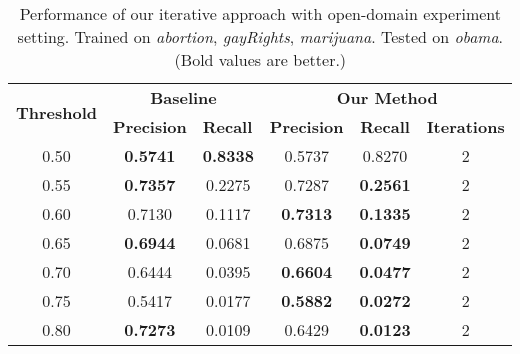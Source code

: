 \documentclass[11pt,a4paper]{article}
\begin{document}
\begin{table*}[h]
\begin{center}
\begin{tabular}{|c||c|c|c|c|c|}
\hline
\multicolumn{1}{|c|}{\multirow{2}{*}{\bf Threshold}} & \multicolumn{2}{c|}{\bf Baseline}  & \multicolumn{3}{c|}{\bf Our Method}    \\ \cline{2-6} 
\multicolumn{1}{|c|}{}   & \multicolumn{1}{l|}{\bf Precision} & \multicolumn{1}{l|}{\bf Recall} & \multicolumn{1}{l|}{\bf Precision} & \multicolumn{1}{c|}{\bf Recall} & \multicolumn{1}{l|}{\bf Iterations} \\ \hline
 \hline
0.50 &\bf 0.5741 &\bf 0.8338 & 0.5737 & 0.8270 & 2 \\
0.55 &\bf 0.7357 & 0.2275 & 0.7287 &\bf 0.2561 & 2 \\
0.60 & 0.7130 & 0.1117 &\bf 0.7313 &\bf 0.1335 & 2 \\
0.65 &\bf 0.6944 & 0.0681 & 0.6875 &\bf 0.0749 & 2 \\
0.70 & 0.6444 & 0.0395 &\bf 0.6604 &\bf 0.0477 & 2 \\
0.75 & 0.5417 & 0.0177 &\bf 0.5882 &\bf 0.0272 & 2 \\
0.80 &\bf 0.7273 & 0.0109 & 0.6429 &\bf 0.0123 & 2
\\\hline
\end{tabular}
\end{center}
\caption{\label{tab:cross-obama} Performance of our iterative approach with open-domain experiment setting. Trained on {\it abortion}, {\it gayRights}, {\it marijuana}. Tested on {\it obama}. (Bold values are better.)}
\end{table*}
\end{document}
